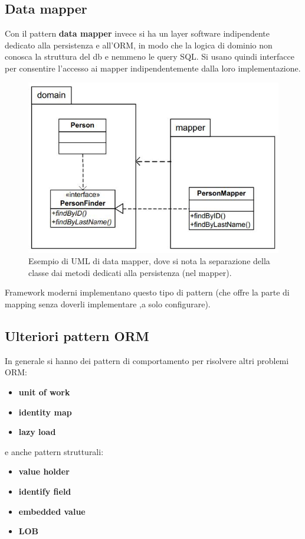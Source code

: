 \documentclass[a4paper,12pt, oneside]{book}
\begin{document}
\subsection{Data mapper}
Con il pattern \textbf{data mapper} invece si ha un layer software indipendente
dedicato alla persistenza e all'ORM, in modo che la logica di dominio non
conosca la struttura del db e nemmeno le query SQL. Si usano quindi interfacce
per consentire l'accesso ai mapper indipendentemente dalla loro
implementazione.
\begin{figure}
  \centering
  \includegraphics[scale = 0.4]{img/dm.jpg}
  \caption{Esempio di UML di data mapper, dove si nota la separazione della
    classe dai metodi dedicati alla persistenza (nel mapper).}
\end{figure}
Framework moderni implementano questo tipo di pattern (che offre la parte di
mapping senza doverli implementare ,a solo configurare). 
\subsection{Ulteriori pattern ORM}
In generale si hanno dei pattern di comportamento per risolvere altri problemi
ORM: 
\begin{itemize}
  \item \textbf{unit of work}
  \item \textbf{identity map}
  \item \textbf{lazy load}
\end{itemize}
e anche pattern strutturali:
\begin{itemize}
  \item \textbf{value holder}
  \item \textbf{identify field}
  \item \textbf{embedded value}
  \item \textbf{LOB}
\end{itemize}
\end{document}

